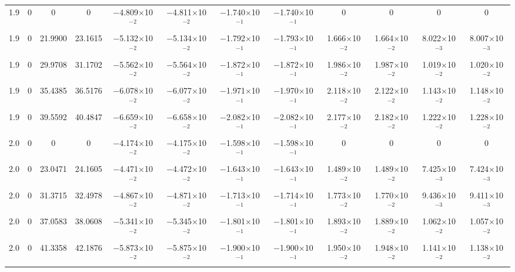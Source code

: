 \documentclass[aps,prd,twocolumn,showpacs,groupedaddress,nofootinbib]{revtex4}
\begin{document}
\begin{widetext}
\begin{table}[h]
\begin{tabular}{|c|c|c|c|c|c|c|c|c|c|c|c|}
  1.9&  0&  0&  0& $-$4.809$\times$10$^{-2}$& $-$4.811$\times$10$^{-2}$& $-$1.740$\times$10$^{-1}$& $-$1.740$\times$10$^{-1}$&  0&  0&  0&  0\\
  1.9&  0& 21.9900& 23.1615& $-$5.132$\times$10$^{-2}$& $-$5.134$\times$10$^{-2}$& $-$1.792$\times$10$^{-1}$& $-$1.793$\times$10$^{-1}$&  1.666$\times$10$^{-2}$&  1.664$\times$10$^{-2}$&  8.022$\times$10$^{-3}$&  8.007$\times$10$^{-3}$\\
  1.9&  0& 29.9708& 31.1702& $-$5.562$\times$10$^{-2}$& $-$5.564$\times$10$^{-2}$& $-$1.872$\times$10$^{-1}$& $-$1.872$\times$10$^{-1}$&  1.986$\times$10$^{-2}$&  1.987$\times$10$^{-2}$&  1.019$\times$10$^{-2}$&  1.020$\times$10$^{-2}$\\
  1.9&  0& 35.4385& 36.5176& $-$6.078$\times$10$^{-2}$& $-$6.077$\times$10$^{-2}$& $-$1.971$\times$10$^{-1}$& $-$1.970$\times$10$^{-1}$&  2.118$\times$10$^{-2}$&  2.122$\times$10$^{-2}$&  1.143$\times$10$^{-2}$&  1.148$\times$10$^{-2}$\\
  1.9&  0& 39.5592& 40.4847& $-$6.659$\times$10$^{-2}$& $-$6.658$\times$10$^{-2}$& $-$2.082$\times$10$^{-1}$& $-$2.082$\times$10$^{-1}$&  2.177$\times$10$^{-2}$&  2.182$\times$10$^{-2}$&  1.222$\times$10$^{-2}$&  1.228$\times$10$^{-2}$\\
  2.0&  0&  0&  0& $-$4.174$\times$10$^{-2}$& $-$4.175$\times$10$^{-2}$& $-$1.598$\times$10$^{-1}$& $-$1.598$\times$10$^{-1}$&  0&  0&  0&  0\\
  2.0&  0& 23.0471& 24.1605& $-$4.471$\times$10$^{-2}$& $-$4.472$\times$10$^{-2}$& $-$1.643$\times$10$^{-1}$& $-$1.643$\times$10$^{-1}$&  1.489$\times$10$^{-2}$&  1.489$\times$10$^{-2}$&  7.425$\times$10$^{-3}$&  7.424$\times$10$^{-3}$\\
  2.0&  0& 31.3715& 32.4978& $-$4.867$\times$10$^{-2}$& $-$4.871$\times$10$^{-2}$& $-$1.713$\times$10$^{-1}$& $-$1.714$\times$10$^{-1}$&  1.773$\times$10$^{-2}$&  1.770$\times$10$^{-2}$&  9.436$\times$10$^{-3}$&  9.411$\times$10$^{-3}$\\
  2.0&  0& 37.0583& 38.0608& $-$5.341$\times$10$^{-2}$& $-$5.345$\times$10$^{-2}$& $-$1.801$\times$10$^{-1}$& $-$1.801$\times$10$^{-1}$&  1.893$\times$10$^{-2}$&  1.889$\times$10$^{-2}$&  1.062$\times$10$^{-2}$&  1.057$\times$10$^{-2}$\\
  2.0&  0& 41.3358& 42.1876& $-$5.873$\times$10$^{-2}$& $-$5.875$\times$10$^{-2}$& $-$1.900$\times$10$^{-1}$& $-$1.900$\times$10$^{-1}$&  1.950$\times$10$^{-2}$&  1.948$\times$10$^{-2}$&  1.141$\times$10$^{-2}$&  1.138$\times$10$^{-2}$\\



\end{tabular}
\end{table}
\end{widetext}
\end{document}
